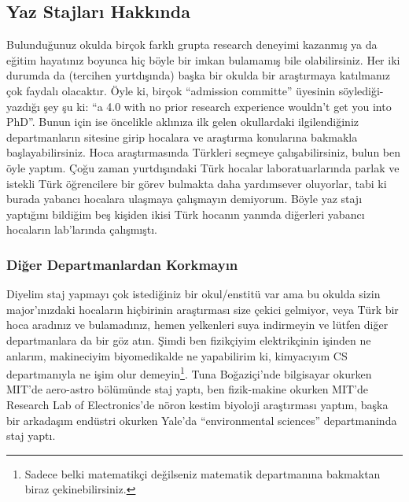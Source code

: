 \documentclass[12pt]{article}
\begin{document}
\subsection{Yaz Stajları Hakkında}
Bulunduğunuz okulda birçok farklı grupta research deneyimi kazanmış ya da eğitim hayatınız boyunca hiç böyle bir imkan bulamamış bile olabilirsiniz. Her iki durumda da (tercihen yurtdışında) başka bir okulda bir araştırmaya katılmanız çok faydalı olacaktır. Öyle ki, birçok “admission committe” üyesinin söylediği-yazdığı şey şu ki: “a 4.0 with no prior research experience wouldn’t get you into PhD”. Bunun için ise öncelikle aklınıza ilk gelen okullardaki ilgilendiğiniz departmanların sitesine girip hocalara ve araştırma konularına bakmakla başlayabilirsiniz. Hoca araştırmasında Türkleri seçmeye çalışabilirsiniz, bulun ben öyle yaptım. Çoğu zaman yurtdışındaki Türk hocalar laboratuarlarında parlak ve istekli Türk öğrencilere bir görev bulmakta daha yardımsever oluyorlar, tabi ki burada yabancı hocalara ulaşmaya çalışmayın demiyorum. Böyle yaz stajı yaptığını bildiğim beş kişiden ikisi Türk hocanın yanında diğerleri yabancı hocaların lab’larında çalışmıştı. 

\subsubsection{Diğer Departmanlardan Korkmayın}
Diyelim staj yapmayı çok istediğiniz bir okul/enstitü var ama bu okulda sizin major’ınızdaki hocaların hiçbirinin araştırması size çekici gelmiyor, veya Türk bir hoca aradınız ve bulamadınız, hemen yelkenleri suya indirmeyin ve lütfen diğer departmanlara da bir göz atın. Şimdi ben fizikçiyim elektrikçinin işinden ne anlarım, makineciyim biyomedikalde ne yapabilirim ki, kimyacıyım CS departmanıyla ne işim olur demeyin\footnote{Sadece belki matematikçi değilseniz matematik departmanına bakmaktan biraz çekinebilirsiniz.}.  Tuna Boğaziçi’nde bilgisayar okurken MIT’de aero-astro bölümünde staj yaptı, ben fizik-makine okurken MIT’de Research Lab of Electronics’de nöron kestim biyoloji araştırması yaptım, başka bir arkadaşım endüstri okurken Yale’da “environmental sciences” departmaninda staj yaptı.
\end{document}
